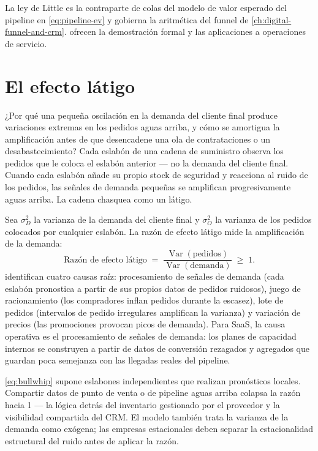 La ley de Little es la contraparte de colas del modelo de valor esperado del pipeline en \cref{eq:pipeline-ev} y gobierna la aritmética del funnel de \cref{ch:digital-funnel-and-crm}. \textcite{cachon2024matching} ofrecen la demostración formal y las aplicaciones a operaciones de servicio.

\section{El efecto látigo}\label{sec:bullwhip}

¿Por qué una pequeña oscilación en la demanda del cliente final produce variaciones extremas en los pedidos aguas arriba, y cómo se amortigua la amplificación antes de que desencadene una ola de contrataciones o un desabastecimiento? Cada eslabón de una cadena de suministro observa los pedidos que le coloca el eslabón anterior --- no la demanda del cliente final. Cuando cada eslabón añade su propio stock de seguridad y reacciona al ruido de los pedidos, las señales de demanda pequeñas se amplifican progresivamente aguas arriba. La cadena chasquea como un látigo.

Sea \(\sigma^2_D\) la varianza de la demanda del cliente final y \(\sigma^2_O\) la varianza de los pedidos colocados por cualquier eslabón. La razón de efecto látigo mide la amplificación de la demanda:
\begin{equation}\label{eq:bullwhip}
  \text{Razón de efecto látigo} \;=\; \frac{\operatorname{Var}(\text{pedidos})}{\operatorname{Var}(\text{demanda})} \;\ge\; 1.
\end{equation}
\textcite{lee1997bullwhip} identifican cuatro causas raíz: procesamiento de señales de demanda (cada eslabón pronostica a partir de sus propios datos de pedidos ruidosos), juego de racionamiento (los compradores inflan pedidos durante la escasez), lote de pedidos (intervalos de pedido irregulares amplifican la varianza) y variación de precios (las promociones provocan picos de demanda). Para SaaS, la causa operativa es el procesamiento de señales de demanda: los planes de capacidad internos se construyen a partir de datos de conversión rezagados y agregados que guardan poca semejanza con las llegadas reales del pipeline.

\cref{eq:bullwhip} supone eslabones independientes que realizan pronósticos locales. Compartir datos de punto de venta o de pipeline aguas arriba colapsa la razón hacia 1 --- la lógica detrás del inventario gestionado por el proveedor y la visibilidad compartida del CRM. El modelo también trata la varianza de la demanda como exógena; las empresas estacionales deben separar la estacionalidad estructural del ruido antes de aplicar la razón.

